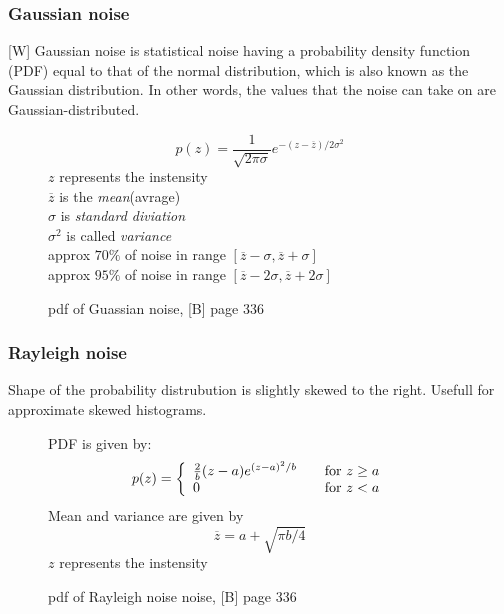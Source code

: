 \documentclass[12pt]{article}
\begin{document}
	\subsubsection{Gaussian noise}
	[W] Gaussian noise is statistical noise having a probability density function (PDF) equal to 
	that of the normal distribution, which is also known as the Gaussian distribution. In other
	words, the values that the noise can take on are Gaussian-distributed.

	\begin{figure}[h]
		\begin{equation}
			p(z) = \frac{1}{\sqrt{2 \pi \sigma} }   e^{-(z - \overline{z}) / 2 \sigma^2 }
		\end{equation}
		$z$ represents the instensity \\
		$\overline{z}$ is the \textit{mean}(avrage) \\
		$\sigma$ is \textit{standard diviation} \\
		$\sigma ^2$ is called \textit{variance} \\
		approx $70\%$ of noise in range $[\overline{z} - \sigma, \overline{z} + \sigma]$ \\
		approx $95\%$ of noise in range $[\overline{z} - 2\sigma, \overline{z} + 2\sigma]$ \\
		\caption{pdf of Guassian noise, [B]	page 336}
		\label{GuassianPDF}
	\end{figure}
	
	\subsubsection{Rayleigh noise}
	Shape of the probability distrubution is slightly skewed to the right. Usefull for approximate skewed histograms.

	\begin{figure}[h!]
		PDF is given by:
		\begin{equation}
			p(z) = \left\{ 
			  \begin{array}{l l}
			    \frac{2}{b}(z - a)e^{(z-a)^2 /b} & \quad \text{for $z \geq a$} \\
			    0 & \quad \text{for $z < a$} 
			  \end{array} \right.
		\end{equation}
		Mean and variance are given by
		\begin{equation}
			\overline{z} = a + \sqrt{\pi b/4}
		\end{equation}
		$z$ represents the instensity \\
		\caption{pdf of Rayleigh noise noise, [B]	page 336}
		\label{RayleighPDF}
	\end{figure}
	
\end{document}
